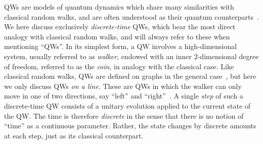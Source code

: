 \acp{QW} are models of quantum dynamics which share many similarities with classical random walks, and are often understood as their quantum counterparts~\cite{aharonov2000quantum,kempe2003quantum,venegasandraca2012quantum,portugal2013quantum}.
We here discuss exclusively \emph{discrete-time} \acp{QW}, which bear the most direct analogy with classical random walks, and will always refer to these when mentioning ``QWs''.
In its simplest form, a \ac{QW} involves a high-dimensional system, usually referred to as \emph{walker}, endowed with an inner $2$-dimensional degree of freedom, referred to as the \emph{coin}, in analogy with the classical case.
Like classical random walks, QWs are defined on graphs in the general case~\cite{aharonov2000quantum}, but here we only discuss QWs \emph{on a line}. These are QWs in which the walker can only move in one of two directions, say ``left'' and ``right''~\cite{ambainis2001onedimensional}.
A single \textit{step} of such a discrete-time \ac{QW} consists of a unitary evolution applied to the current state of the \ac{QW}. The time is therefore \emph{discrete} in the sense that there is no notion of ``time'' as a continuous parameter. Rather, the state changes by discrete amounts at each step, just as its classical counterpart.



